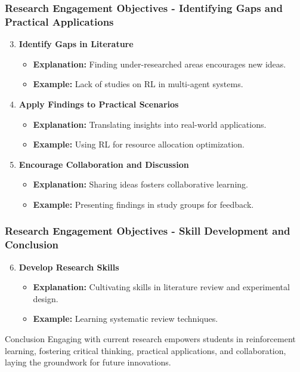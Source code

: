\documentclass[aspectratio=169]{beamer}
\begin{document}
\begin{frame}[fragile]
    \frametitle{Research Engagement Objectives - Identifying Gaps and Practical Applications}
    \begin{enumerate}
        \setcounter{enumi}{2}
        \item \textbf{Identify Gaps in Literature}
            \begin{itemize}
                \item \textbf{Explanation:} Finding under-researched areas encourages new ideas.
                \item \textbf{Example:} Lack of studies on RL in multi-agent systems.
            \end{itemize}
        \item \textbf{Apply Findings to Practical Scenarios}
            \begin{itemize}
                \item \textbf{Explanation:} Translating insights into real-world applications.
                \item \textbf{Example:} Using RL for resource allocation optimization.
            \end{itemize}
        \item \textbf{Encourage Collaboration and Discussion}
            \begin{itemize}
                \item \textbf{Explanation:} Sharing ideas fosters collaborative learning.
                \item \textbf{Example:} Presenting findings in study groups for feedback.
            \end{itemize}
    \end{enumerate}
\end{frame}

\begin{frame}[fragile]
    \frametitle{Research Engagement Objectives - Skill Development and Conclusion}
    \begin{enumerate}
        \setcounter{enumi}{5}
        \item \textbf{Develop Research Skills}
            \begin{itemize}
                \item \textbf{Explanation:} Cultivating skills in literature review and experimental design.
                \item \textbf{Example:} Learning systematic review techniques.
            \end{itemize}
    \end{enumerate}
    
    \begin{block}{Conclusion}
        Engaging with current research empowers students in reinforcement learning, fostering critical thinking, practical applications, and collaboration, laying the groundwork for future innovations.
    \end{block}
\end{frame}
\end{document}
